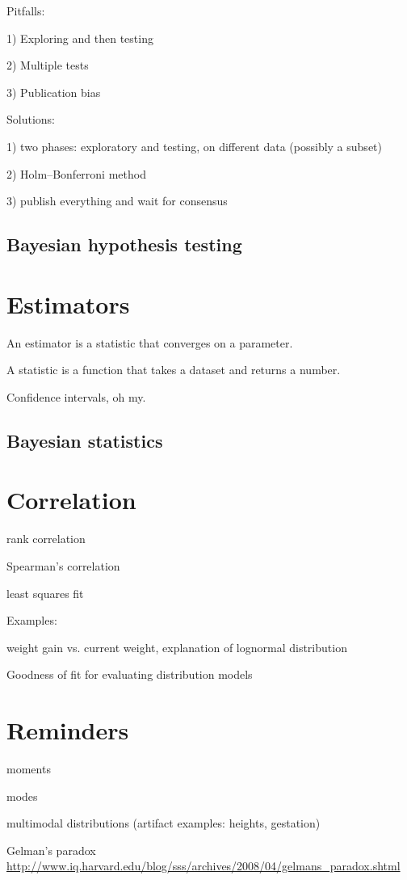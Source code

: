 \documentclass[10pt]{book}
\begin{document}
   

Pitfalls:

1) Exploring and then testing

2) Multiple tests

3) Publication bias


Solutions:

1) two phases: exploratory and testing, on different data (possibly a subset)

2) Holm–Bonferroni method

3) publish everything and wait for consensus


\section{Bayesian hypothesis testing}




\chapter{Estimators}

An estimator is a statistic that converges on a parameter.

A statistic is a function that takes a dataset and returns a number.

Confidence intervals, oh my.


\section{Bayesian statistics}



\chapter{Correlation}

rank correlation

Spearman's correlation

least squares fit

Examples:

    weight gain vs. current weight, explanation of lognormal distribution

Goodness of fit for evaluating distribution models


\chapter{Reminders}

moments

modes

   multimodal distributions (artifact examples: heights, gestation)

Gelman's paradox
\url{http://www.iq.harvard.edu/blog/sss/archives/2008/04/gelmans_paradox.shtml}

\printindex

\clearemptydoublepage
\end{document}
